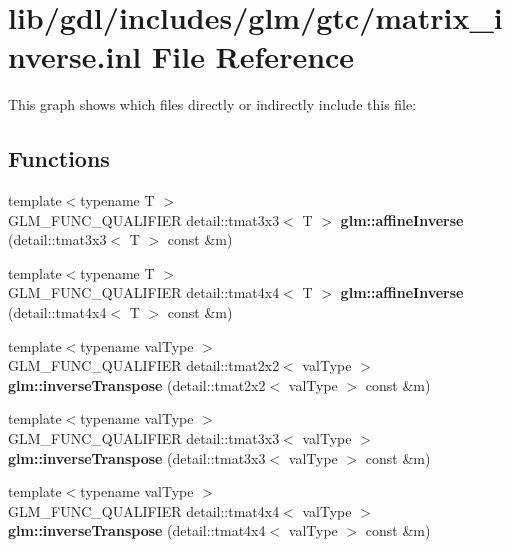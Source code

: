 \hypertarget{matrix__inverse_8inl}{}\section{lib/gdl/includes/glm/gtc/matrix\+\_\+inverse.inl File Reference}
\label{matrix__inverse_8inl}
This graph shows which files directly or indirectly include this file\+:
\subsection*{Functions}
\begin{DoxyCompactItemize}
\item 
\hypertarget{namespaceglm_a95a9a0c884de397420c2b48eed765f82}{}{\footnotesize template$<$typename T $>$ }\\G\+L\+M\+\_\+\+F\+U\+N\+C\+\_\+\+Q\+U\+A\+L\+I\+F\+I\+E\+R detail\+::tmat3x3$<$ T $>$ {\bfseries glm\+::affine\+Inverse} (detail\+::tmat3x3$<$ T $>$ const \&m)\label{namespaceglm_a95a9a0c884de397420c2b48eed765f82}

\item 
\hypertarget{namespaceglm_a4d94de1f111e09fb413c79fcca8836ff}{}{\footnotesize template$<$typename T $>$ }\\G\+L\+M\+\_\+\+F\+U\+N\+C\+\_\+\+Q\+U\+A\+L\+I\+F\+I\+E\+R detail\+::tmat4x4$<$ T $>$ {\bfseries glm\+::affine\+Inverse} (detail\+::tmat4x4$<$ T $>$ const \&m)\label{namespaceglm_a4d94de1f111e09fb413c79fcca8836ff}

\item 
\hypertarget{namespaceglm_aa6b8ec4bc1611b1d2784e81d27ff3f13}{}{\footnotesize template$<$typename val\+Type $>$ }\\G\+L\+M\+\_\+\+F\+U\+N\+C\+\_\+\+Q\+U\+A\+L\+I\+F\+I\+E\+R detail\+::tmat2x2$<$ val\+Type $>$ {\bfseries glm\+::inverse\+Transpose} (detail\+::tmat2x2$<$ val\+Type $>$ const \&m)\label{namespaceglm_aa6b8ec4bc1611b1d2784e81d27ff3f13}

\item 
\hypertarget{namespaceglm_aa7d23629fec4e42bcb8e153948f62fc1}{}{\footnotesize template$<$typename val\+Type $>$ }\\G\+L\+M\+\_\+\+F\+U\+N\+C\+\_\+\+Q\+U\+A\+L\+I\+F\+I\+E\+R detail\+::tmat3x3$<$ val\+Type $>$ {\bfseries glm\+::inverse\+Transpose} (detail\+::tmat3x3$<$ val\+Type $>$ const \&m)\label{namespaceglm_aa7d23629fec4e42bcb8e153948f62fc1}

\item 
\hypertarget{namespaceglm_af5ab380be693032a4f1b4fe58841c13e}{}{\footnotesize template$<$typename val\+Type $>$ }\\G\+L\+M\+\_\+\+F\+U\+N\+C\+\_\+\+Q\+U\+A\+L\+I\+F\+I\+E\+R detail\+::tmat4x4$<$ val\+Type $>$ {\bfseries glm\+::inverse\+Transpose} (detail\+::tmat4x4$<$ val\+Type $>$ const \&m)\label{namespaceglm_af5ab380be693032a4f1b4fe58841c13e}

\end{DoxyCompactItemize}


